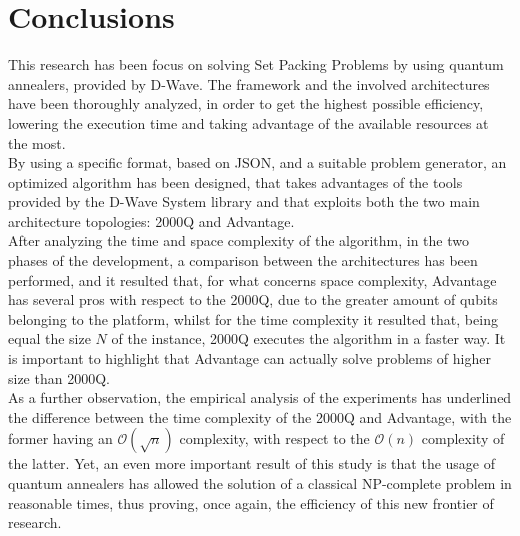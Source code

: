 \documentclass[oneside,a4paper]{article}
\begin{document}
\section{Conclusions}
This research has been focus on solving Set Packing Problems by using quantum annealers, provided by D-Wave. The framework and the involved architectures have been thoroughly analyzed, in order to get the highest possible efficiency, lowering the execution time and taking advantage of the available resources at the most. 
\\
By using a specific format, based on JSON, and a suitable problem generator, an optimized algorithm has been designed, that takes advantages of the tools provided by the D-Wave System library and that exploits both the two main architecture topologies: 2000Q and Advantage.
\\
After analyzing the time and space complexity of the algorithm, in the two phases of the development, a comparison between the architectures has been performed, and it resulted that, for what concerns space complexity, Advantage has several pros with respect to the 2000Q, due to the greater amount of qubits belonging to the platform, whilst for the time complexity it resulted that, being equal the size $N$ of the instance, 2000Q executes the algorithm in a faster way. It is important to highlight that Advantage can actually solve problems of higher size than 2000Q.
\\
As a further observation, the empirical analysis of the experiments has underlined the difference between the time complexity of the 2000Q and Advantage, with the former having an $\mathcal{O}(\sqrt{n})$ complexity, with respect to the $\mathcal{O}(n)$ complexity of the latter. Yet, an even more important result of this study is that the usage of quantum annealers has allowed the solution of a classical NP-complete problem in reasonable times, thus proving, once again, the efficiency of this new frontier of research.



\end{document}
